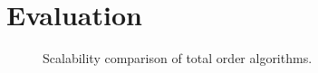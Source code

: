\section{Evaluation}
\label{sec:evaluation}

\begin{figure}[t]
        \begin{minipage}[t]{.32\textwidth}
                \centering
                \newline
                \caption{Scalability comparison of total order algorithms.}

\end{minipage}
\end{figure}
